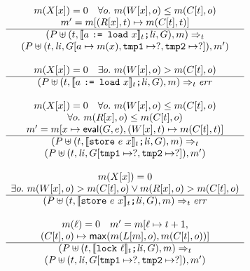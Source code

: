 \documentclass[preprint, 10pt]{sigplanconf}
\newcommand{\meanl}{\ensuremath{[ \! [}}
\newcommand{\meanr}{\ensuremath{] \! ]}}
\newcommand{\means}[1]{\ensuremath{\meanl #1 \meanr}}
\newcommand{\load}[2]{#1\ \texttt{:= load}\ #2}
\newcommand{\store}[2]{\texttt{store}\ #2\ #1}
\newcommand{\lock}[1]{\texttt{lock}\ #1}
\newcommand{\instr}[2]{\ensuremath{\means{#2}_{#1}}}
\newcommand{\cfg}[2]{\ensuremath{(#1, #2)}}
\begin{document}
\begin{figure}[htb]
\[
\begin{array}{c}

\multicolumn{1}{c}{m(X[x]) = 0 \quad \forall o.\ m(W[x], o) \le m(C[t], o)}
\\
\multicolumn{1}{c}{m' = m[(R[x], t) \mapsto m(C[t], t)]}
\\
\hline
\cfg{P \uplus (t, \instr{t}{\load{a}{x}}\texttt{;} \mathit{li}, G)}{m}
\Rightarrow_{t} \\
\cfg{P \uplus (t, \mathit{li}, G[a \mapsto m(x), \texttt{tmp1} \mapsto ?, \texttt{tmp2} \mapsto ?])}{m'}
\\\\

\multicolumn{1}{c}{m(X[x]) = 0 \quad \exists o.\ m(W[x], o) > m(C[t], o)}
\\
\hline
\cfg{P \uplus (t, \instr{t}{\load{a}{x}}\texttt{;} \mathit{li}, G)}{m}
\Rightarrow_{t} \mathit{err}
\\\\

\multicolumn{1}{c}{m(X[x]) = 0 \quad \forall o.\ m(W[x], o) \le m(C[t], o)}
\\
\multicolumn{1}{c}{\forall o.\ m(R[x], o) \le m(C[t], o)}
\\
\multicolumn{1}{c}{m' = m[x \mapsto \mathsf{eval}(G, e), (W[x], t) \mapsto m(C[t], t)]}
\\
\hline
\cfg{P \uplus (t, \instr{t}{\store{x}{e}}\texttt{;} \mathit{li}, G)}{m}
\Rightarrow_{t} \\
\cfg{P \uplus (t, \mathit{li}, G[\texttt{tmp1} \mapsto ?, \texttt{tmp2} \mapsto ?])}{m'}
\\\\

\multicolumn{1}{c}{m(X[x]) = 0}
\\
\multicolumn{1}{c}{\exists o.\ m(W[x], o) > m(C[t], o) \vee m(R[x], o) > m(C[t], o)}
\\
\hline
\cfg{P \uplus (t, \instr{t}{\store{x}{e}}\texttt{;} \mathit{li}, G)}{m}
\Rightarrow_{t} \mathit{err}
\\\\

\multicolumn{1}{c}{m(\ell) = 0 \quad m' = m[\ell \mapsto t + 1,}
\\
\multicolumn{1}{c}{ (C[t], o) \mapsto \mathsf{max}(m(L[m], o), m(C[t], o))]}
\\
\hline
\cfg{P \uplus (t, \instr{t}{\lock{\ell}}\texttt{;} \mathit{li}, G)}{m}
\Rightarrow_{t} \\
\cfg{P \uplus (t, \mathit{li}, G[\texttt{tmp1} \mapsto ?, \texttt{tmp2} \mapsto ?])}{m'}
\\\\


\end{array}\]
\end{figure}
\end{document}
